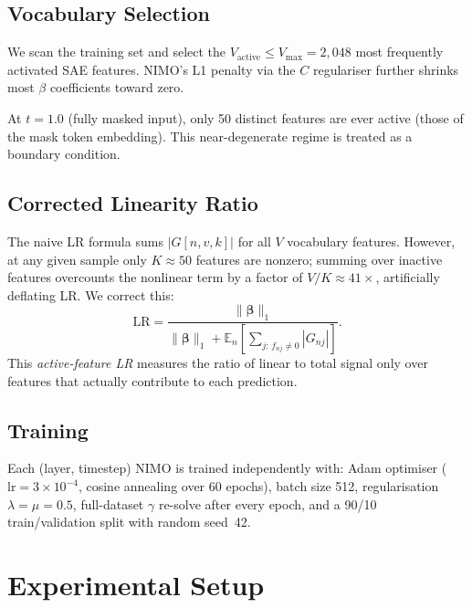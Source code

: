 \documentclass{article}
\newcommand{\LR}{\mathrm{LR}}
\newcommand{\bfbeta}{\boldsymbol{\beta}}
\begin{document}
\subsection{Vocabulary Selection}

We scan the training set and select the $V_\mathrm{active} \le V_\mathrm{max} = 2{,}048$ most frequently activated SAE features. NIMO's L1 penalty via the $C$ regulariser further shrinks most $\beta$ coefficients toward zero.

At $t = 1.0$ (fully masked input), only 50 distinct features are ever active (those of the mask token embedding). This near-degenerate regime is treated as a boundary condition.

\subsection{Corrected Linearity Ratio}
\label{sec:lr}

The naive LR formula sums $|G[n, v, k]|$ for all $V$ vocabulary features. However, at any given sample only $K \approx 50$ features are nonzero; summing over inactive features overcounts the nonlinear term by a factor of $V/K \approx 41\times$, artificially deflating LR. We correct this:
\begin{equation}
    \LR = \frac{\|\bfbeta\|_1}{\|\bfbeta\|_1 + \mathbb{E}_n\!\left[\displaystyle\sum_{j:\,f_{nj} \neq 0} |G_{nj}|\right]}.
    \label{eq:lr_corrected}
\end{equation}
This \emph{active-feature LR} measures the ratio of linear to total signal only over features that actually contribute to each prediction.

\subsection{Training}

Each (layer, timestep) NIMO is trained independently with:
Adam optimiser ($\mathrm{lr} = 3\times10^{-4}$, cosine annealing over 60 epochs), batch size 512, regularisation $\lambda = \mu = 0.5$, full-dataset $\gamma$ re-solve after every epoch, and a 90/10 train/validation split with random seed~42.

\section{Experimental Setup}
\end{document}
